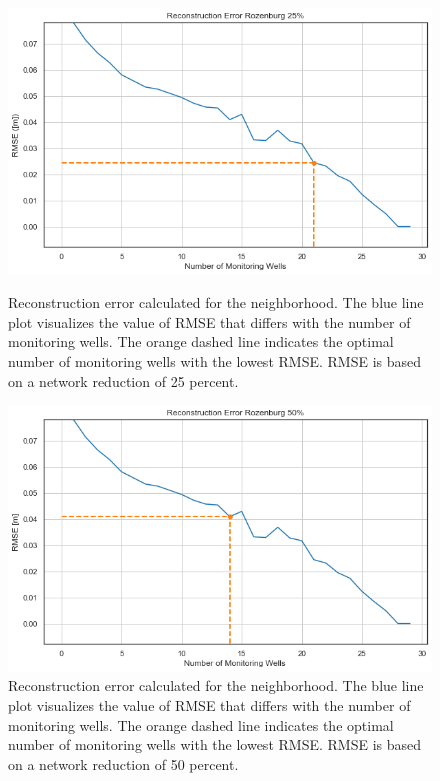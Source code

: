 \begin{figure}[htbp]
    \centering
    \begin{minipage}[b]{0.48\linewidth}
        \includegraphics[width=\linewidth]{figures/res roz/25roz.png}
        \caption{Reconstruction error calculated for the neighborhood. The blue line plot visualizes the value of RMSE that differs with the number of monitoring wells. The orange dashed line indicates the optimal number of monitoring wells with the lowest RMSE. RMSE is based on a network reduction of 25 percent.}
        \label{fig:25roz}
    \end{minipage}
    \hfill
    \begin{minipage}[b]{0.48\linewidth}
        \includegraphics[width=\linewidth]{figures/res roz/roz50.png}
        \caption{Reconstruction error calculated for the neighborhood. The blue line plot visualizes the value of RMSE that differs with the number of monitoring wells. The orange dashed line indicates the optimal number of monitoring wells with the lowest RMSE. RMSE is based on a network reduction of 50 percent.}
        \label{fig:roz50}
    \end{minipage}
\end{figure}

